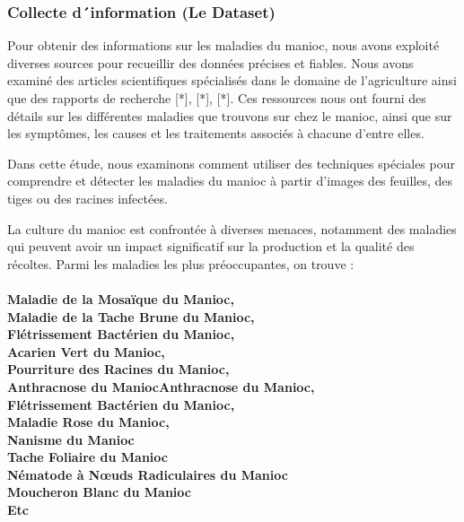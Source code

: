 \documentclass{article}
\begin{document}
		
		\subsubsection{Collecte d´information (Le Dataset)}
		Pour obtenir des informations sur les maladies du manioc, nous avons exploité diverses sources pour recueillir des données précises et fiables. Nous avons examiné des articles scientifiques spécialisés dans le domaine de l'agriculture ainsi que des rapports de recherche [*], [*], [*]. Ces ressources nous ont fourni des détails sur les différentes maladies que trouvons sur chez le manioc, ainsi que sur les symptômes, les causes et les traitements associés à chacune d'entre elles.
		
		\quad Dans cette étude, nous examinons comment utiliser des techniques spéciales pour comprendre et détecter les maladies du manioc à partir d'images des feuilles, des tiges ou des racines infectées.
		
		\quad La culture du manioc est confrontée à diverses menaces, notamment des maladies qui peuvent avoir un impact significatif sur la production et la qualité des récoltes. Parmi les maladies les plus préoccupantes\cite{msikita_lutte_nodate}, on trouve : \\ \\
		\textemdash \textbf{  Maladie de la Mosaïque du Manioc, } \\
		\textemdash \textbf{ Maladie de la Tache Brune du Manioc, } \\
		\textemdash \textbf{ Flétrissement Bactérien du Manioc, } \\
		\textemdash \textbf{ Acarien Vert du Manioc, } \\
		\textemdash \textbf{  Pourriture des Racines du Manioc, } \\
		\textemdash \textbf{ Anthracnose du ManiocAnthracnose du Manioc, } \\
		\textemdash \textbf{ Flétrissement Bactérien du Manioc, } \\
		\textemdash \textbf{ Maladie Rose du Manioc, } \\
		\textemdash \textbf{ Nanisme du Manioc } \\
		\textemdash \textbf{ Tache Foliaire du Manioc } \\	
		\textemdash \textbf{ Nématode à Nœuds Radiculaires du Manioc } \\	
		\textemdash \textbf{ Moucheron Blanc du Manioc } \\	
		\textemdash \textbf{ Etc } \\	
		
\end{document}
